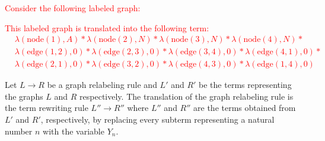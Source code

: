      
\textcolor{red}{
    \begin{example}
        Consider the following labeled graph:
        This labeled graph is translated into the following term:
        \begin{align*}
            &\lambda(\text{node}(1),A) * \lambda(\text{node}(2),N) * \lambda(\text{node}(3),N) * \lambda(\text{node}(4),N) * \\
            &\lambda(\text{edge}(1,2),0) * \lambda(\text{edge}(2,3),0) * \lambda(\text{edge}(3,4),0) * \lambda(\text{edge}(4,1),0) * \\
            &\lambda(\text{edge}(2,1),0) * \lambda(\text{edge}(3,2),0) * \lambda(\text{edge}(4,3),0) * \lambda(\text{edge}(1,4),0)
        \end{align*}
    \end{example}
}

\begin{definition}
    \label{def:gls_to_actrs:rules}
    Let $L \rightarrow R$ be a graph relabeling rule and $L'$ and $R'$ be the terms representing the graphs $L$ and $R$ respectively. The translation of the graph relabeling rule is the term rewriting rule $L'' \rightarrow R''$ where $L''$ and $R''$ are the terms obtained from $L'$ and $R'$, respectively, by replacing every subterm representing a natural number $n$ with the variable $Y_n$.
\end{definition}


